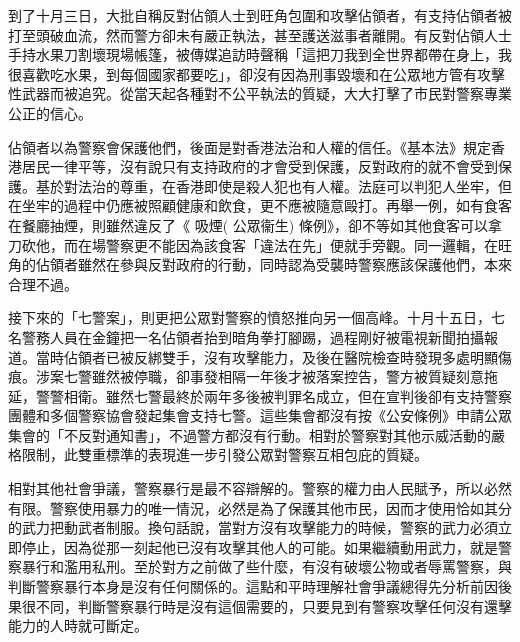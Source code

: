 到了十月三日，大批自稱反對佔領人士到旺角包圍和攻擊佔領者，有支持佔領者被打至頭破血流，然而警方卻未有嚴正執法，甚至護送滋事者離開。有反對佔領人士手持水果刀割壞現場帳篷，被傳媒追訪時聲稱「這把刀我到全世界都帶在身上，我很喜歡吃水果，到每個國家都要吃」，卻沒有因為刑事毀壞和在公眾地方管有攻擊性武器而被追究。從當天起各種對不公平執法的質疑，大大打擊了市民對警察專業公正的信心。

佔領者以為警察會保護他們，後面是對香港法治和人權的信任。《基本法》規定香港居民一律平等，沒有說只有支持政府的才會受到保護，反對政府的就不會受到保護。基於對法治的尊重，在香港即使是殺人犯也有人權。法庭可以判犯人坐牢，但在坐牢的過程中仍應被照顧健康和飲食，更不應被隨意毆打。再舉一例，如有食客在餐廳抽煙，則雖然違反了《 吸煙( 公眾衞生) 條例》，卻不等如其他食客可以拿刀砍他，而在場警察更不能因為該食客「違法在先」便就手旁觀。同一邏輯，在旺角的佔領者雖然在參與反對政府的行動，同時認為受襲時警察應該保護他們，本來合理不過。

接下來的「七警案」，則更把公眾對警察的憤怒推向另一個高峰。十月十五日，七名警務人員在金鐘把一名佔領者抬到暗角拳打腳踢，過程剛好被電視新聞拍攝報道。當時佔領者已被反綁雙手，沒有攻擊能力，及後在醫院檢查時發現多處明顯傷痕。涉案七警雖然被停職，卻事發相隔一年後才被落案控告，警方被質疑刻意拖延，警警相衛。雖然七警最終於兩年多後被判罪名成立，但在宣判後卻有支持警察團體和多個警察協會發起集會支持七警。這些集會都沒有按《公安條例》申請公眾集會的「不反對通知書」，不過警方都沒有行動。相對於警察對其他示威活動的嚴格限制，此雙重標準的表現進一步引發公眾對警察互相包庇的質疑。


相對其他社會爭議，警察暴行是最不容辯解的。警察的權力由人民賦予，所以必然有限。警察使用暴力的唯一情況，必然是為了保護其他市民，因而才使用恰如其分的武力把動武者制服。換句話說，當對方沒有攻擊能力的時候，警察的武力必須立即停止，因為從那一刻起他已沒有攻擊其他人的可能。如果繼續動用武力，就是警察暴行和濫用私刑。至於對方之前做了些什麼，有沒有破壞公物或者辱罵警察，與判斷警察暴行本身是沒有任何關係的。這點和平時理解社會爭議總得先分析前因後果很不同，判斷警察暴行時是沒有這個需要的，只要見到有警察攻擊任何沒有還擊能力的人時就可斷定。

